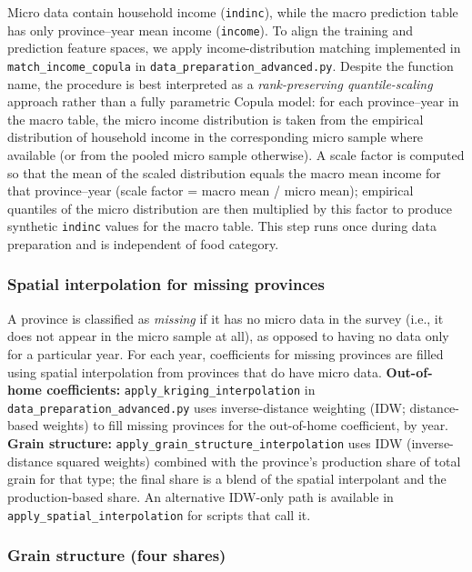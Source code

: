 Micro data contain household income (\texttt{indinc}), while the macro prediction table has only province--year mean income (\texttt{income}). To align the training and prediction feature spaces, we apply income-distribution matching implemented in \texttt{match\_income\_copula} in \texttt{data\_preparation\_advanced.py}. Despite the function name, the procedure is best interpreted as a \emph{rank-preserving quantile-scaling} approach rather than a fully parametric Copula model: for each province--year in the macro table, the micro income distribution is taken from the empirical distribution of household income in the corresponding micro sample where available (or from the pooled micro sample otherwise). A scale factor is computed so that the mean of the scaled distribution equals the macro mean income for that province--year (scale factor = macro mean / micro mean); empirical quantiles of the micro distribution are then multiplied by this factor to produce synthetic \texttt{indinc} values for the macro table. This step runs once during data preparation and is independent of food category.

\subsubsection{Spatial interpolation for missing provinces}

A province is classified as \emph{missing} if it has no micro data in the survey (i.e., it does not appear in the micro sample at all), as opposed to having no data only for a particular year. For each year, coefficients for missing provinces are filled using spatial interpolation from provinces that do have micro data. \textbf{Out-of-home coefficients:} \texttt{apply\_kriging\_interpolation} in \texttt{data\_preparation\_advanced.py} uses inverse-distance weighting (IDW; distance-based weights) to fill missing provinces for the out-of-home coefficient, by year. \textbf{Grain structure:} \texttt{apply\_grain\_structure\_interpolation} uses IDW (inverse-distance squared weights) combined with the province’s production share of total grain for that type; the final share is a blend of the spatial interpolant and the production-based share. An alternative IDW-only path is available in \texttt{apply\_spatial\_interpolation} for scripts that call it.

\subsubsection{Grain structure (four shares)}

